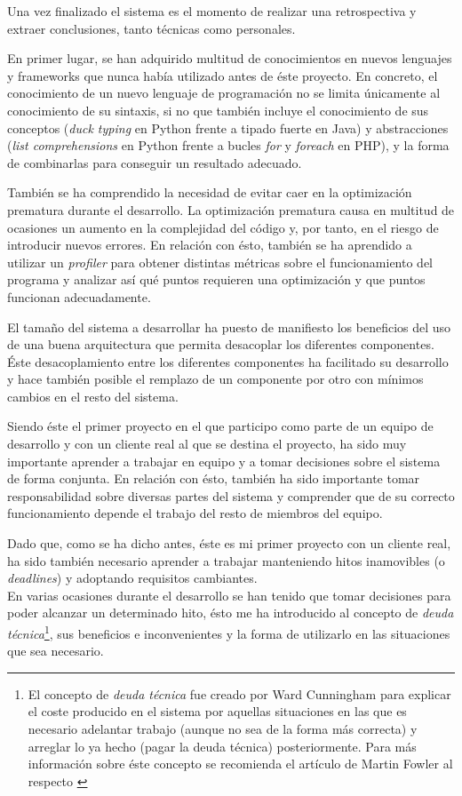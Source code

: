 Una vez finalizado el sistema es el momento de realizar una retrospectiva y extraer
conclusiones, tanto técnicas como personales.

En primer lugar, se han adquirido multitud de conocimientos en nuevos lenguajes y 
frameworks que nunca había utilizado antes de éste proyecto.  En concreto, el 
conocimiento de un nuevo lenguaje de programación no se limita únicamente al 
conocimiento de su sintaxis, si no que también incluye el conocimiento
de sus conceptos (\textit{duck typing} en Python frente a tipado fuerte en Java)
y abstracciones (\textit{list comprehensions} en Python frente a bucles \textit{for}
y \textit{foreach} en PHP), y la forma de combinarlas para conseguir un resultado
adecuado.

También se ha comprendido la necesidad de evitar caer en la optimización prematura
durante el desarrollo.  La optimización prematura causa en multitud de ocasiones 
un aumento en la complejidad del código y, por tanto, en el riesgo de introducir nuevos
errores.  En relación con ésto, también se ha aprendido a utilizar un
\textit{profiler} para obtener distintas métricas sobre el funcionamiento del
programa y analizar así qué puntos requieren una optimización y que puntos 
funcionan adecuadamente.

El tamaño del sistema a desarrollar ha puesto de manifiesto los beneficios del
uso de una buena arquitectura que permita desacoplar los diferentes componentes.
Éste desacoplamiento entre los diferentes componentes ha facilitado su desarrollo
y hace también posible el remplazo de un componente por otro con mínimos cambios
en el resto del sistema.

Siendo éste el primer proyecto en el que participo como parte de un equipo de 
desarrollo y con un cliente real al que se destina el proyecto, ha sido muy
importante aprender a trabajar en equipo y a tomar decisiones sobre el sistema
de forma conjunta.  En relación con ésto, también ha sido importante tomar
responsabilidad sobre diversas partes del sistema y comprender que de su correcto
funcionamiento depende el trabajo del resto de miembros del equipo.

Dado que, como se ha dicho antes, éste es mi primer proyecto con un cliente real,
ha sido también necesario aprender a trabajar manteniendo hitos inamovibles 
(o \textit{deadlines}) y adoptando requisitos cambiantes.\\
En varias ocasiones durante el desarrollo se han tenido que tomar decisiones
para poder alcanzar un determinado hito, ésto me ha introducido al concepto de
\textit{deuda técnica}\footnote{El concepto de \textit{deuda técnica} fue creado por
Ward Cunningham para explicar el coste producido en el sistema por aquellas situaciones
en las que es necesario adelantar trabajo (aunque no sea de la forma más correcta) y
arreglar lo ya hecho (pagar la deuda técnica) posteriormente.  Para más información
sobre éste concepto se recomienda el artículo de Martin Fowler al respecto \cite{mfowler:technical_debt}},
sus beneficios e inconvenientes y la forma de utilizarlo en las situaciones que sea necesario.


